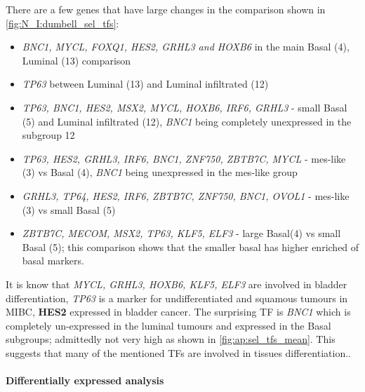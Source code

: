 There are a few genes that have large changes in the comparison shown in \cref{fig:N_I:dumbell_sel_tfs}: 
\begin{itemize}
    \item \textit{BNC1, MYCL, FOXQ1, HES2, GRHL3 and HOXB6} in the main Basal (4), Luminal (13) comparison
    \item \textit{TP63} between Luminal (13) and Luminal infiltrated (12)
    \item \textit{TP63, BNC1, HES2, MSX2, MYCL, HOXB6, IRF6, GRHL3} - small Basal (5) and Luminal infiltrated (12), \textit{BNC1} being completely unexpressed in the subgroup 12
    \item \textit{TP63, HES2, GRHL3, IRF6, BNC1, ZNF750, ZBTB7C, MYCL} - mes-like (3) vs Basal (4), \textit{BNC1} being unexpressed in the mes-like group
    \item \textit{GRHL3, TP64, HES2, IRF6, ZBTB7C, ZNF750, BNC1, OVOL1} - mes-like (3) vs small Basal (5) 
    \item \textit{ZBTB7C, MECOM, MSX2, TP63, KLF5, ELF3} - large Basal(4) vs small Basal (5); this comparison shows that the smaller basal has higher enriched of basal markers.
\end{itemize}


It is know that \textit{MYCL, GRHL3, HOXB6, KLF5, ELF3} are involved in bladder differentiation, \textit{TP63} is a marker for undifferentiated and squamous tumours in MIBC, \textbf{HES2} expressed in bladder cancer. The surprising TF is \textit{BNC1} which is completely un-expressed in the luminal tumours and expressed in the Basal subgroups; admittedly not very high as shown in \cref{fig:ap:sel_tfs_mean}. This suggests that many of the mentioned TFs are involved in tissues differentiation..

\paragraph*{Differentially expressed analysis}

